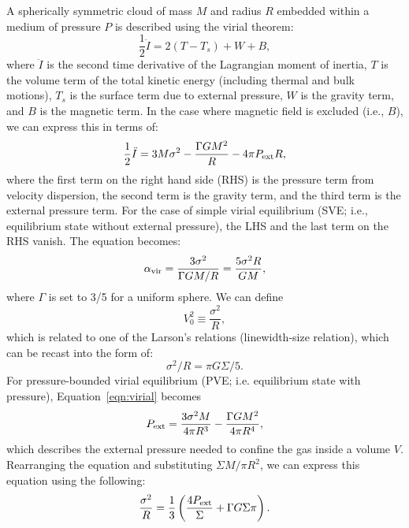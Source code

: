\IfFileExists{emulateapjlegacy.cls}{\documentclass[iop]{emulateapjlegacy}}{\documentclass[iop]{emulateapj}}
\begin{document}
A spherically symmetric cloud of mass $M$ and radius $R$ embedded within
a medium of pressure $P$ is described using the virial theorem:
\begin{equation}
\frac{1}{2}\ddot I = 2(T - T_s) + W + B,
\end{equation}
where $\ddot I$ is the second time derivative of the Lagrangian moment of inertia,
$T$ is the volume term of the total kinetic energy (including thermal and
bulk motions), $T_s$ is the surface term due to external pressure,
$W$ is the gravity term, and $B$ is the magnetic term.
In the case where magnetic field is excluded (i.e., $B$), we can express this in terms of:
\begin{equation}
\frac{1}{2}\ddot I = 3 M \sigma^2 - \frac{\Gamma GM^2}{R} - 4\pi P_{\rm ext} R,
\label{eqn:virial}
\end{equation}
where the first term on the right hand side (RHS) is the pressure term from velocity dispersion, the second
term is the gravity term, and the third term is the external pressure term.
For the case of simple virial equilibrium (SVE; i.e., equilibrium state without external pressure),
the LHS and the last term on the RHS vanish. The equation becomes:
\begin{equation}
\alpha_{\rm vir} = \frac{3\sigma^2}{\Gamma GM/R} = \frac{5\sigma^2R}{GM},
\label{eqn:alpha}
\end{equation}
where $\Gamma$ is set to 3/5 for a uniform sphere.
We can define
\begin{equation}
V_0^2\equiv\frac{\sigma^2}{R},
\end{equation}
which is related to one of the Larson's relations (linewidth-size relation), 
which can be recast into the form of:
\begin{equation}
\sigma^2/R = \pi G \Sigma/5.
\end{equation}
For pressure-bounded virial equilibrium (PVE; i.e. equilibrium state with pressure), %
Equation~\ref{eqn:virial} becomes
\begin{equation}
P_{\rm ext} = \frac{3\sigma^2M}{4\pi R^3} - \frac{\Gamma G M^2}{4\pi R^4},
\label{eqn:pext}
\end{equation}
which describes the external pressure needed to confine the gas inside a volume $V$.
Rearranging the equation and substituting $\Sigma$\eq$M/\pi R^2$, we can express
this equation using the following:
\begin{equation}
\frac{\sigma^2}{R} = \frac{1}{3}\left(\frac{4P_{\rm ext}}{\Sigma} + \Gamma G \Sigma \pi \right).
\label{eqn:v0}
\end{equation}
\end{document}

